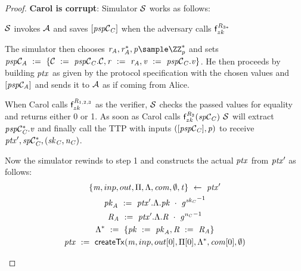 \begin{proof}
    \textbf{Carol is corrupt}: Simulator $\mathcal{S}$ works as follows:
    \begin{asparaenum}
        \item $\mathcal{S}$ invokes $\mathcal{A}$ and saves $[\mathit{psp}\mathcal{C}_{\mathit{C}}]$ when the adversary calls $\mathsf{f}^{\mathit{R}_{3*}}_{zk}$
        \item The simulator then chooses $\varBlindingFactorAlice, \funStar{\varBlindingFactorAlice}, \varFundValue \sample \cnstIntegersPrimeWithoutZero{\varPrime}$ and sets \\ $\mathit{psp}\mathcal{C}_{\mathit{A}} ~:=~ \{ \mathcal{C} ~:=~ \mathit{psp}\mathcal{C}_{\mathit{C}}.\mathcal{C}, \mathit{r} ~:=~ \mathit{r}_{\mathit{A}}, \mathit{v} ~:=~ \mathit{psp}\mathcal{C}_{\mathit{C}}.\mathit{v} \}$.
        He then proceeds by building $\mathit{ptx}$ as given by the protocol specification with the chosen values and $[\mathit{psp}\mathcal{C}_{\mathit{A}}]$ and sends it to $\mathcal{A}$ as if coming from Alice.
        \item When Carol calls $\mathsf{f}^{\mathit{R}_{1,2,3}}_{zk}$ as the verifier, $\mathcal{S}$ checks the passed values for equality and returns either 0 or 1.
        As soon as Carol calls $\mathsf{f}^{\mathit{R}_{2}}_{zk}(\mathit{sp}\mathcal{C}_{\mathit{C}})$ $\mathcal{S}$ will extract $\mathit{p} \mathit{sp}\mathcal{C}_{\mathit{C}}^*.\mathit{v}$ and finally call the TTP with inputs $([\mathit{psp}\mathcal{C}_{\mathit{C}}], \mathit{p})$ to receive ${\mathit{ptx}}', \mathit{sp}\mathcal{C}_{\mathit{C}}^*, (\mathit{sk}_{\mathit{C}}, \mathit{\mathit{n}_{\mathit{C}}})$.
        \item Now the simulator rewinds to step 1 and constructs the actual $\mathit{ptx}$ from ${\mathit{ptx}}'$ as follows:
        \begin{gather*}
            \{ \varMsg, \varInputs, \varOutputs, \varProofs, \varSigContext, \varCommits, \cnstEmptySet, \varTime \} \opFunResult \funStarAlt{\varPreTx} \\
            \varPubKeyAlice \opAssign \funStarAlt{\varPreTx}.\varSigContext.\varPubKey \opAddPoint {\funGen{\varSecKeyCarol}}^{-1} \\
            \varRandAlice \opAssign \funStarAlt{\varPreTx}.\varSigContext.\varRand \opAddPoint {\funGen{\varNonceCarol}}^{-1} \\
            \funStar{\varSigContext} \opAssign \{ \varPubKey \opAssign \varPubKeyAlice, \varRand \opAssign \varRandAlice \} \\
            \varPreTx \opAssign \procCreatePreTx{\varMsg}{\varInputs}{\varOutputs[0]}{\varProofs[0]}{\funStar{\varSigContext}}{\varCommits[0]}{\cnstEmptySet}{\varTime}

\end{gather*}
\end{asparaenum}
\end{proof}
